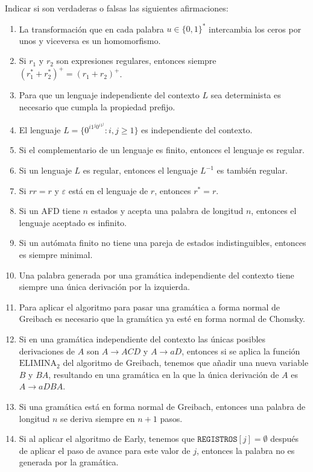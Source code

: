 \documentclass[12pt]{article}
\begin{document}
    \begin{ejercicio}[2.5 puntos]
        Indicar si son verdaderas o falsas las siguientes afirmaciones:
        \begin{enumerate}
            \item La transformación que en cada palabra $u \in \{0, 1\}^*$ intercambia los ceros por unos y viceversa es un homomorfismo.
            \item Si $r_1$ y $r_2$ son expresiones regulares, entonces siempre $(r_1^* + r_2^*)^+ = (r_1 + r_2)^+$.
            \item Para que un lenguaje independiente del contexto $L$ sea determinista es necesario que cumpla la propiedad prefijo.
            \item El lenguaje $L = \{0^{i1^j0^{i1^j}} : i, j \geq 1\}$ es independiente del contexto.
            \item Si el complementario de un lenguaje es finito, entonces el lenguaje es regular.
            \item Si un lenguaje $L$ es regular, entonces el lenguaje $L^{-1}$ es también regular.
            \item Si $rr = r$ y $\varepsilon$ está en el lenguaje de $r$, entonces $r^* = r$.
            \item Si un AFD tiene $n$ estados y acepta una palabra de longitud $n$, entonces el lenguaje aceptado es infinito.
            \item Si un autómata finito no tiene una pareja de estados indistinguibles, entonces es siempre minimal.
            \item Una palabra generada por una gramática independiente del contexto tiene siempre una única derivación por la izquierda.
            \item Para aplicar el algoritmo para pasar una gramática a forma normal de Greibach es necesario que la gramática ya esté en forma normal de Chomsky.
            \item Si en una gramática independiente del contexto las únicas posibles derivaciones de $A$ son $A \to ACD$ y $A \to aD$, entonces si se aplica la función $\text{ELIMINA}_2$ del algoritmo de Greibach, tenemos que añadir una nueva variable $B$ y $BA$, resultando en una gramática en la que la única derivación de $A$ es $A \to aDBA$.
            \item Si una gramática está en forma normal de Greibach, entonces una palabra de longitud $n$ se deriva siempre en $n + 1$ pasos.
            \item Si al aplicar el algoritmo de Early, tenemos que $\texttt{REGISTROS}[j] = \emptyset$ después de aplicar el paso de avance para este valor de $j$, entonces la palabra no es generada por la gramática.
        \end{enumerate}
    \end{ejercicio}
\end{document}
